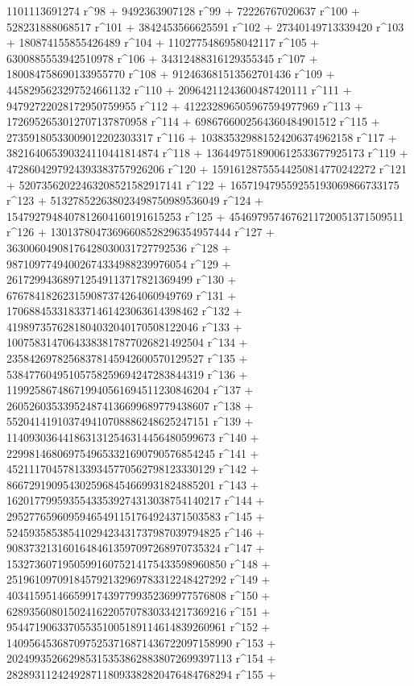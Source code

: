        1101113691274 r^98 + 9492363907128 r^99 + 
       72226767020637 r^100 + 528231888068517 r^101 + 
       3842453566625591 r^102 + 27340149713339420 r^103 + 
       180874155855426489 r^104 + 1102775486958042117 r^105 + 
       6300885553942510978 r^106 + 34312488316129355345 r^107 + 
       180084758690133955770 r^108 + 912463681513562701436 r^109 + 
       4458295623297524661132 r^110 + 20964211243600487420111 r^111 + 
       94792722028172950759955 r^112 + 
       412232896505967594977969 r^113 + 
       1726952653012707137870958 r^114 + 
       6986766002564360484901512 r^115 + 
       27359180533009012202303317 r^116 + 
       103835329881524206374962158 r^117 + 
       382164065390324110441814874 r^118 + 
       1364497518900612533677925173 r^119 + 
       4728604297924393383757926206 r^120 + 
       15916128755544250814770242272 r^121 + 
       52073562022463208521582917141 r^122 + 
       165719479559255193069866733175 r^123 + 
       513278522638023498750989536049 r^124 + 
       1547927948407812604160191615253 r^125 + 
       4546979574676211720051371509511 r^126 + 
       13013780473696608528296354957444 r^127 + 
       36300604908176428030031727792536 r^128 + 
       98710977494002674334988239976054 r^129 + 
       261729943689712549113717821369499 r^130 + 
       676784182623159087374264060949769 r^131 + 
       1706884533183371461423063614398462 r^132 + 
       4198973576281804032040170508122046 r^133 + 
       10075831470643383817877026821492504 r^134 + 
       23584269782568378145942600570129527 r^135 + 
       53847760495105758259694247283844319 r^136 + 
       119925867486719940561694511230846204 r^137 + 
       260526035339524874136699689779438607 r^138 + 
       552041419103749410708886248625247151 r^139 + 
       1140930364418631312546314456480599673 r^140 + 
       2299814680697549653321690790576854245 r^141 + 
       4521117045781339345770562798123330129 r^142 + 
       8667291909543025968454669931824885201 r^143 + 
       16201779959355433539274313038754140217 r^144 + 
       29527765960959465491151764924371503583 r^145 + 
       52459358538541029423431737987039794825 r^146 + 
       90837321316016484613597097268970735324 r^147 + 
       153273607195059916075214175433598960850 r^148 + 
       251961097091845792132969783312248427292 r^149 + 
       403415951466599174397799352369977576808 r^150 + 
       628935608015024162205707830334217369216 r^151 + 
       954471906337055351005189114614839260961 r^152 + 
       1409564536870975253716871436722097158990 r^153 + 
       2024993526629853153538628838072699397113 r^154 + 
       2828931124249287118093382820476484768294 r^155 + 

